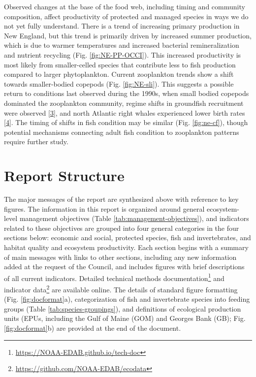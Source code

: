\documentclass[10pt,]{article}
\let\rmarkdownfootnote\footnote%
\def\footnote{\protect\rmarkdownfootnote}
\begin{document}
Observed changes at the base of the food web, including timing and
community composition, affect productivity of protected and managed
species in ways we do not yet fully understand. There is a trend of
increasing primary production in New England, but this trend is
primarily driven by increased summer production, which is due to warmer
temperatures and increased bacterial remineralization and nutrient
recycling (Fig. \ref{fig:NE-PP-OCCI}). This increased productivity is
most likely from smaller-celled species that contribute less to fish
production compared to larger phytoplankton. Current zooplankton trends
show a shift towards smaller-bodied copepods (Fig. \ref{fig:NE-sli}).
This suggests a possible return to conditions last observed during the
1990s, when small bodied copepods dominated the zooplankton community,
regime shifts in groundfish recruitment were observed
{[}\protect\hyperlink{ref-perretti_regime_2017}{3}{]}, and north
Atlantic right whales experienced lower birth rates
{[}\protect\hyperlink{ref-greene_remote_2013}{4}{]}. The timing of
shifts in fish condition may be similar (Fig. \ref{fig:ne-cf}), though
potential mechanisms connecting adult fish condition to zooplankton
patterns require further study.

\section{Report Structure}\label{report-structure}

The major messages of the report are synthesized above with reference to
key figures. The information in this report is organized around general
ecosystem-level management objectives (Table
\ref{tab:management-objectives}), and indicators related to these
objectives are grouped into four general categories in the four sections
below: economic and social, protected species, fish and invertebrates,
and habitat quality and ecosystem productivity. Each section begins with
a summary of main messages with links to other sections, including any
new information added at the request of the Council, and includes
figures with brief descriptions of all current indicators. Detailed
technical methods documentation\footnote{\url{https://NOAA-EDAB.github.io/tech-doc}}
and indicator data\footnote{\url{https://github.com/NOAA-EDAB/ecodata}}
are available online. The details of standard figure formatting (Fig.
\ref{fig:docformat}a), categorization of fish and invertebrate species
into feeding groups (Table \ref{tab:species-groupings}), and definitions
of ecological production units (EPUs, including the Gulf of Maine (GOM)
and Georges Bank (GB); Fig. \ref{fig:docformat}b) are provided at the
end of the document.
\end{document}
